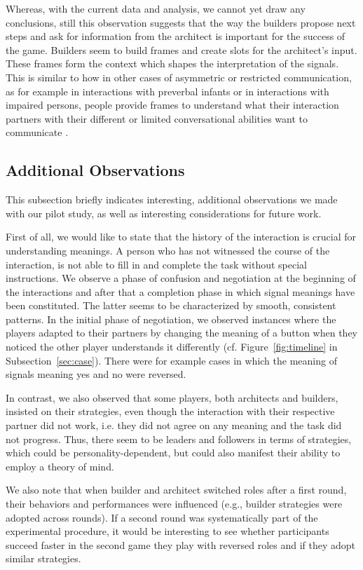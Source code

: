 Whereas, with the current data and analysis, we cannot yet draw any conclusions, still this observation suggests that the way the builders propose next steps and ask for information from the architect is important for the success of the game. Builders seem to build frames and create slots for the architect's input. These frames form the context which shapes the interpretation of the signals. This is similar to how in other cases of asymmetric or restricted communication, as for example in interactions with preverbal infants or in interactions with impaired persons, people provide frames to understand what their interaction partners with their different or limited conversational abilities want to communicate \cite{ochs1979propositions, goodwin1995co}.

\subsection{Additional Observations}

This subsection briefly indicates interesting, additional observations we made with our pilot study, as well as interesting considerations for future work.

First of all, we would like to state that the history of the interaction is crucial for understanding meanings. A person who has not witnessed the course of the interaction, is not able to fill in and complete the task without special instructions. We observe a phase of confusion and negotiation at the beginning of the interactions and after that a completion phase in which signal meanings have been constituted. The latter seems to be characterized by smooth, consistent patterns. In the initial phase of negotiation, we observed instances where the players adapted to their partners by changing the meaning of a button when they noticed the other player understands it differently (cf. Figure~\ref{fig:timeline} in Subsection~\ref{sec:case}). There were for example cases in which the meaning of signals meaning yes and no were reversed.

In contrast, we also observed that some players, both architects and builders, insisted on their strategies, even though the interaction with their respective partner did not work, i.e. they did not agree on any meaning and the task did not progress. Thus, there seem to be leaders and followers in terms of strategies, which could be personality-dependent, but could also manifest their ability to employ a theory of mind.

We also note that when builder and architect switched roles after a first round, their behaviors and performances were influenced (e.g., builder strategies were adopted across rounds). If a second round was systematically part of the experimental procedure, it would be interesting to see whether participants succeed faster in the second game they play with reversed roles and if they adopt similar strategies.

